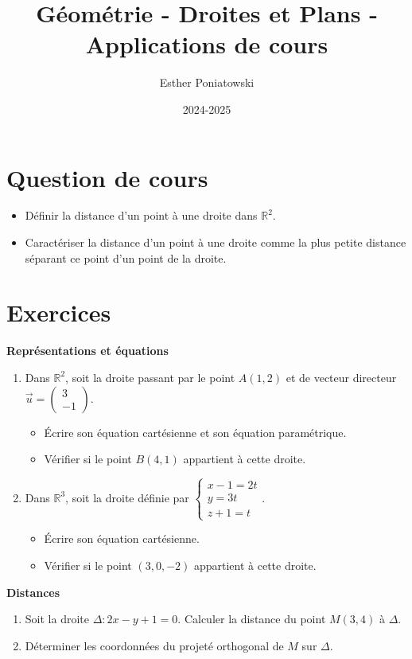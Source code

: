 \documentclass[10pt,a4paper]{article}
\title{Géométrie - Droites et Plans - Applications de cours}
\author{Esther Poniatowski}
\date{2024-2025}
\begin{document}
\maketitle

\section*{Question de cours}
\begin{itemize}
    \item Définir la distance d'un point à une droite dans $\mathbb{R}^2$.
    \item Caractériser la distance d'un point à une droite comme la plus petite distance séparant ce point d'un point de la droite.
\end{itemize}

\section*{Exercices}

\textbf{Représentations et équations}
\begin{enumerate}
    \item Dans $\mathbb{R}^2$, soit la droite passant par le point $A(1, 2)$ et de vecteur directeur $\vec{u} = \begin{pmatrix} 3 \\ -1 \end{pmatrix}$.
    \begin{itemize}
        \item Écrire son équation cartésienne et son équation paramétrique.
        \item Vérifier si le point $B(4, 1)$ appartient à cette droite.
    \end{itemize}
    \item Dans $\mathbb{R}^3$, soit la droite définie par $\begin{cases} x - 1 = 2t \\ y = 3t \\ z + 1 = t \end{cases}$.
    \begin{itemize}
        \item Écrire son équation cartésienne.
        \item Vérifier si le point $(3, 0, -2)$ appartient à cette droite.
    \end{itemize}
\end{enumerate}

\textbf{Distances}
\begin{enumerate}
    \item Soit la droite $\Delta : 2x - y + 1 = 0$. Calculer la distance du point $M(3, 4)$ à $\Delta$.
    \item Déterminer les coordonnées du projeté orthogonal de $M$ sur $\Delta$.
\end{enumerate}
\end{document}
